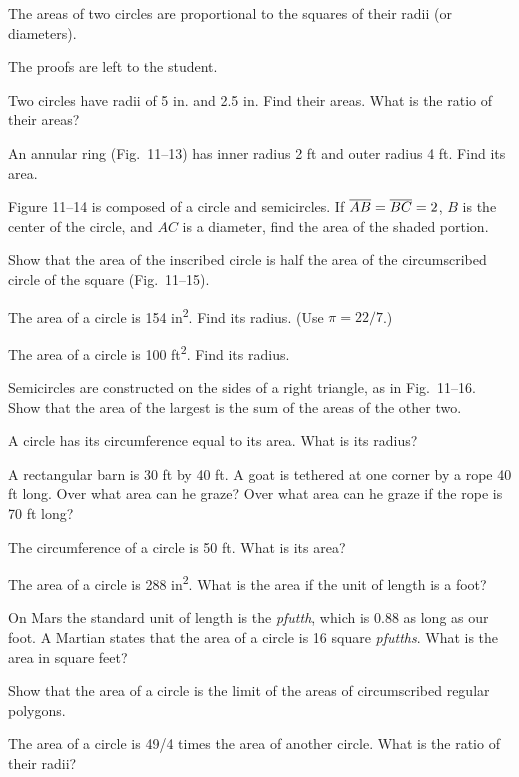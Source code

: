 \documentclass[11pt]{book}
\theoremstyle{XIplainnote}
\theoremstyle{bkplain}
\begin{document}
\begin{corollary}
The areas of two circles are proportional to the squares of their radii (or
diameters).
\end{corollary}

\noindent The proofs are left to the student.

\begin{exercisecols}
\begin{exlist}
\item Two circles have radii of 5 in. and 2.5 in. Find their areas. What is the
      ratio of their areas?
\item An annular ring (Fig.~11--13) has inner radius 2 ft and outer radius
      4 ft. Find its area.
\exfig{\FIGXITHIRTEEN}
\item Figure 11--14 is composed of a circle and semicircles. If
      $\overline{AB} = \overline{BC} = 2$, $B$ is the center of the circle, and $AC$ is a
      diameter, find the area of the shaded portion.
\exfig{\FIGXIFOURTEEN}
\item Show that the area of the inscribed circle is half the area of the
      circumscribed circle of the square (Fig.~11--15).
\exfig{\FIGXIFIFTEEN}
\item The area of a circle is 154 in\textsuperscript{2}. Find its radius.
      (Use $\pi = 22/7$.)
\item The area of a circle is 100 ft\textsuperscript{2}. Find its radius.
\item Semicircles are constructed on the sides of a right triangle, as in
      Fig.~11--16. Show that the area of the largest is the sum of the areas of
      the other two.
\exfig{\FIGXISIXTEEN}
\item A circle has its circumference equal to its area. What is its radius?
\item A rectangular barn is 30 ft by 40 ft. A goat is tethered at one corner by
      a rope 40 ft long. Over what area can he graze? Over what area can he
      graze if the rope is 70 ft long?
\item The circumference of a circle is 50 ft. What is its area?
\item The area of a circle is 288 in\textsuperscript{2}. What is the area if
      the unit of length is a foot?
\item On Mars the standard unit of length is the \emph{pfutth}, which is 0.88
      as long as our foot. A Martian states that the area of a circle is 16
      square \emph{pfutths}. What is the area in square feet?
\item[\stex 13.] Show that the area of a circle is the limit of the areas of
      circumscribed regular polygons.
\item[14.] The area of a circle is 49/4 times the area of another circle. What
      is the ratio of their radii?
\end{exlist}
\end{exercisecols}
\end{document}
